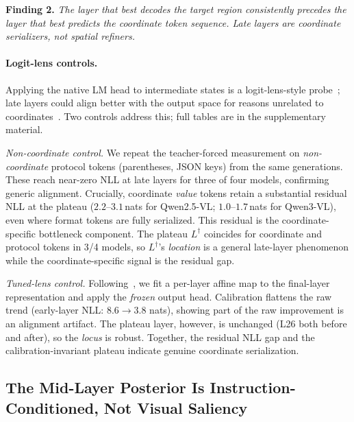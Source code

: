 \begin{tcolorbox}[colback=gray!8, colframe=gray!40, boxrule=0.4pt, arc=2pt, left=4pt, right=4pt, top=3pt, bottom=3pt]
\textbf{Finding 2.}
\emph{The layer that best decodes the target region consistently precedes the layer that best predicts the coordinate token sequence. Late layers are coordinate serializers, not spatial refiners.}
\end{tcolorbox}

\paragraph{Logit-lens controls.}
Applying the native LM head to intermediate states is a logit-lens-style probe~\citep{nostalgebraist2020logitlens}; late layers could align better with the output space for reasons unrelated to coordinates~\citep{geva2021transformer,meng2022locating}. Two controls address this; full tables are in the supplementary material.

\emph{Non-coordinate control.}
We repeat the teacher-forced measurement on \emph{non-coordinate} protocol tokens (parentheses, JSON keys) from the same generations. These reach near-zero NLL at late layers for three of four models, confirming generic alignment. Crucially, coordinate \emph{value} tokens retain a substantial residual NLL at the plateau ($2.2$--$3.1$\,nats for Qwen2.5-VL; $1.0$--$1.7$\,nats for Qwen3-VL), even where format tokens are fully serialized. This residual is the coordinate-specific bottleneck component. The plateau $L^\dagger$ coincides for coordinate and protocol tokens in 3/4 models, so $L^\dagger$'s \emph{location} is a general late-layer phenomenon while the coordinate-specific signal is the residual gap.

\emph{Tuned-lens control.}
Following~\citep{belrose2023tunedlens}, we fit a per-layer affine map to the final-layer representation and apply the \emph{frozen} output head. Calibration flattens the raw trend (early-layer NLL: $8.6\to 3.8$ nats), showing part of the raw improvement is an alignment artifact. The plateau layer, however, is unchanged (L26 both before and after), so the \emph{locus} is robust. Together, the residual NLL gap and the calibration-invariant plateau indicate genuine coordinate serialization.

\subsection{The Mid-Layer Posterior Is Instruction-Conditioned, Not Visual Saliency}
\label{sec:analysis:counterfactual}


